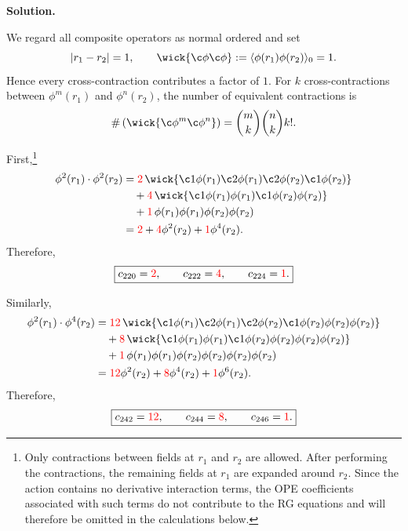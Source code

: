 \documentclass[11pt,a4paper]{article}
\newcounter{problem}
\newcounter{saveequation}
\newenvironment{solution}
{
	\par
	\setcounter{saveequation}{\value{equation}}
	\begingroup
	\setcounter{equation}{0}
	\renewcommand{\theequation}{\arabic{problem}.\arabic{equation}}
	\renewcommand{\theHequation}{sol.\arabic{problem}.\arabic{equation}}
	\noindent\textbf{Solution.}\quad
}
{
	\par
	\endgroup
	\setcounter{equation}{\value{saveequation}}
}
\begin{document}
	\begin{solution}
		We regard all composite operators as normal ordered and set
		\[
		|r_1-r_2|=1,
		\qquad
		\wick{\c\phi\c\phi}:=\langle \phi(r_1)\phi(r_2)\rangle_0=1.
		\]
		Hence every cross-contraction contributes a factor of \(1\). For \(k\)
		cross-contractions between \(\phi^m(r_1)\) and \(\phi^n(r_2)\), the
		number of equivalent contractions is
		\[
		\#\left(\wick{\c\phi^m\c\phi^n}\right)=\binom{m}{k}\binom{n}{k}k!.
		\]
		
		First,\footnote{Only contractions between fields at $r_1$ and $r_2$ are allowed.
			After performing the contractions, the remaining fields at $r_1$
			are expanded around $r_2$. Since the action contains no derivative interaction terms, the OPE coefficients associated with such terms do not contribute to the RG equations and will therefore be omitted in the calculations below.
			}
		\begin{align}
			\phi^2(r_1)\cdot\phi^2(r_2)
			&=
			\textcolor{red}{2}\,
			\wick{
				\c1\phi(r_1)\c2\phi(r_1)
				\c2\phi(r_2)\c1\phi(r_2)
			}
			\notag\\
			&\quad
			+\textcolor{red}{4}\,
			\wick{
				\c1\phi(r_1)\phi(r_1)
				\c1\phi(r_2)\phi(r_2)
			}
			\notag\\
			&\quad
			+\textcolor{red}{1}\,
			\phi(r_1)\phi(r_1)\phi(r_2)\phi(r_2)
			\notag\\
			&=
			\textcolor{red}{2}
			+\textcolor{red}{4}\phi^2(r_2)
			+\textcolor{red}{1}\phi^4(r_2).
		\end{align}
		Therefore,
		\[
		\boxed{
			c_{220}=\textcolor{red}{2},
			\qquad
			c_{222}=\textcolor{red}{4},
			\qquad
			c_{224}=\textcolor{red}{1}.
		}
		\]
		
		Similarly,
		\begin{align}
			\phi^2(r_1)\cdot\phi^4(r_2)
			&=
			\textcolor{red}{12}\,
			\wick{
				\c1\phi(r_1)\c2\phi(r_1)
				\c2\phi(r_2)\c1\phi(r_2)
				\phi(r_2)\phi(r_2)
			}
			\notag\\
			&\quad
			+\textcolor{red}{8}\,
			\wick{
				\c1\phi(r_1)\phi(r_1)
				\c1\phi(r_2)\phi(r_2)\phi(r_2)\phi(r_2)
			}
			\notag\\
			&\quad
			+\textcolor{red}{1}\,
			\phi(r_1)\phi(r_1)
			\phi(r_2)\phi(r_2)\phi(r_2)\phi(r_2)
			\notag\\
			&=
			\textcolor{red}{12}\phi^2(r_2)
			+\textcolor{red}{8}\phi^4(r_2)
			+\textcolor{red}{1}\phi^6(r_2).
		\end{align}
		Therefore,
		\[
		\boxed{
			c_{242}=\textcolor{red}{12},
			\qquad
			c_{244}=\textcolor{red}{8},
			\qquad
			c_{246}=\textcolor{red}{1}.
		}
		\]
		

\end{solution}
\end{document}
